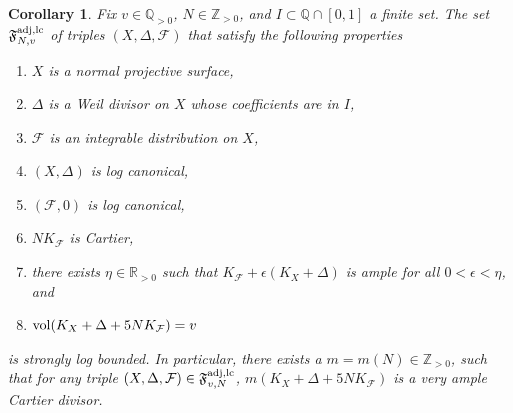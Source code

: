 \documentclass[12pt, a4paper]{amsart}
\newcommand{\setfoliation}[1]{\mathfrak F^{\rm adj, #1}_{N, v}}
\newtheorem{corollary}[theorem]{Corollary}
\theoremstyle{definition}
\theoremstyle{named}
\begin{document}
\begin{corollary}
\label{boundedness.lc.triples.cor.finite.coeff}
Fix 
$v \in \mathbb Q_{>0}$, 
$N \in \mathbb Z_{>0}$, 
and 
$I \subset \mathbb Q \cap [0, 1]$
a finite set.
The set
$\setfoliation{lc}$
of triples 
$(X, \Delta, \mathcal F)$ 
that satisfy the following properties
\begin{enumerate}
\item 
\label{cond.normal.cor.bound}
$X$ 
is a normal projective surface, 
\item 
$\Delta$ 
is a Weil divisor on 
$X$ 
whose coefficients are in 
$I$,
\item 
$\mathcal F$ is an integrable distribution on $X$,

\item 
$(X, \Delta)$ is log canonical, 
\item 
$(\mathcal F, 0)$ is log canonical,
\item
\label{cond.index.cor.bound}
$NK_{\mathcal F}$ is Cartier, 
\item 
\label{cond.nef.cor.bound}
there exists $\eta \in \mathbb R_{>0}$ such that 
$K_\mathcal{F}+\epsilon (K_X+\Delta)$ is ample for all $0< \epsilon < \eta$, and
\item 
\label{cond.vol.cor.bound}
${\rm vol}(K_X+\Delta+5NK_{\mathcal F})=v$

\end{enumerate}
is strongly log bounded.
In particular, there exists a 
$m=m(N) \in \mathbb Z_{>0}$, 
such that for any triple 
$(X,\Delta , \mathcal{F}) \in \mathfrak{F}_{v, N}^{\rm adj, lc}$, 
$m(K_X+\Delta+5NK_\mathcal{F})$ is a very ample Cartier divisor.
\end{corollary}
\end{document}
